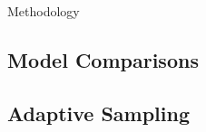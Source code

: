Methodology

\subsection{Model Comparisons}
\label{sec:model}


\subsection{Adaptive Sampling}
\label{sec:adaptive}

